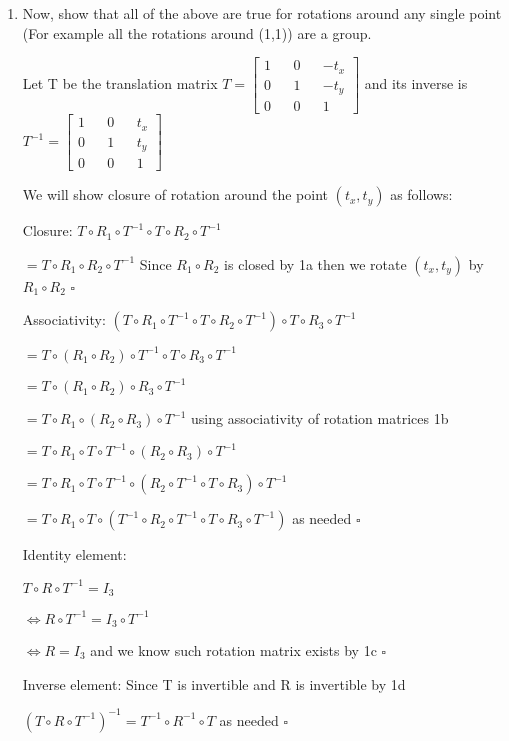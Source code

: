 \documentclass{article}
\begin{document}
\begin{enumerate}
        \item Now, show that all of the above are true for rotations around any single point (For example all the rotations around (1,1)) are a group.
        
        Let T be the translation matrix $T = \begin{bmatrix}
            1 && 0 && - t_x \\ 
            0 && 1 && - t_y \\
            0 && 0 && 1 
        \end{bmatrix}$ and its inverse is $T^{-1} = \begin{bmatrix}
            1 && 0 && t_x \\ 
            0 && 1 && t_y \\
            0 && 0 && 1 
        \end{bmatrix}$

        We will show closure of rotation around the point $(t_x, t_y)$ as follows:

        Closure:  $T \circ R_1 \circ T^{-1} \circ T \circ R_2 \circ T^{-1}$

        $ = T \circ R_1 \circ R_2 \circ T^{-1}$ Since $R_1 \circ R_2$ is closed by 1a then we rotate $(t_x, t_y)$ by $R_1 \circ R_2$ $\square$
        
        Associativity: $(T \circ R_1 \circ T^{-1} \circ T \circ R_2 \circ T^{-1}) \circ T \circ R_3 \circ T^{-1}$

        $ = T \circ (R_1 \circ R_2) \circ T^{-1} \circ T \circ R_3 \circ T^{-1}$

        $ = T \circ (R_1 \circ R_2) \circ R_3 \circ T^{-1}$

        $ = T \circ R_1 \circ (R_2 \circ R_3) \circ T^{-1}$ using associativity of rotation matrices 1b

        $ = T \circ R_1 \circ T \circ T^{-1} \circ (R_2 \circ R_3) \circ T^{-1}$

        $ = T \circ R_1 \circ T \circ T^{-1} \circ (R_2 \circ T^{-1} \circ T \circ R_3) \circ T^{-1}$

        $ = T \circ R_1 \circ T \circ (T^{-1} \circ R_2 \circ T^{-1} \circ T \circ R_3 \circ T^{-1})$ as needed $\square$

        Identity element:

        $T \circ R \circ T^{-1} = I_3$

        $\iff R \circ T^{-1} = I_3 \circ T^{-1}$

        $\iff R = I_3 $ and we know such rotation matrix exists by 1c $\square$

        Inverse element: Since T is invertible and R is invertible by 1d

        $(T \circ R \circ T^{-1})^{-1} = T^{-1} \circ R^{-1} \circ T$ as needed $\square$
    \end{enumerate}
\end{document}
